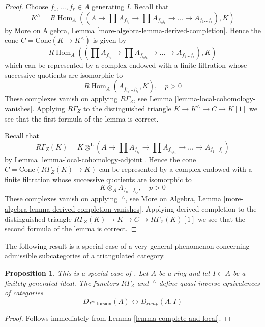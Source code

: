 \documentclass{stacks-project}
\newenvironment{reference}{\comment}{\endcomment}
\theoremstyle{plain}
\newtheorem{proposition}[subsection]{Proposition}
\theoremstyle{definition}
\theoremstyle{remark}
\numberwithin{equation}{subsection}
\def\Hom{\mathop{\mathrm{Hom}}\nolimits}
\begin{document}
\begin{proof}
Choose $f_1, \ldots, f_r \in A$ generating $I$. Recall that
$$
K^\wedge = R\Hom_A\left((A \to \prod A_{f_{i_0}}
\to \prod A_{f_{i_0i_1}} \to \ldots \to A_{f_1 \ldots f_r}), K\right)
$$
by More on Algebra, Lemma \ref{more-algebra-lemma-derived-completion}.
Hence the cone $C = \text{Cone}(K \to K^\wedge)$
is given by
$$
R\Hom_A\left((\prod A_{f_{i_0}}
\to \prod A_{f_{i_0i_1}} \to \ldots \to A_{f_1 \ldots f_r}), K\right)
$$
which can be represented by a complex endowed with a finite filtration
whose successive quotients are isomorphic to
$$
R\Hom_A(A_{f_{i_0} \ldots f_{i_p}}, K), \quad p > 0
$$
These complexes vanish on applying $R\Gamma_Z$, see
Lemma \ref{lemma-local-cohomology-vanishes}. Applying $R\Gamma_Z$
to the distinguished triangle $K \to K^\wedge \to C \to K[1]$
we see that the first formula of the lemma is correct.

\medskip\noindent
Recall that
$$
R\Gamma_Z(K) =
K \otimes^\mathbf{L} (A \to \prod A_{f_{i_0}}
\to \prod A_{f_{i_0i_1}} \to \ldots \to A_{f_1 \ldots f_r})
$$
by Lemma \ref{lemma-local-cohomology-adjoint}.
Hence the cone $C = \text{Cone}(R\Gamma_Z(K) \to K)$
can be represented by a complex endowed with a finite filtration
whose successive quotients are isomorphic to
$$
K \otimes_A A_{f_{i_0} \ldots f_{i_p}}, \quad p > 0
$$
These complexes vanish on applying ${\ }^\wedge$, see
More on Algebra, Lemma \ref{more-algebra-lemma-derived-completion-vanishes}.
Applying derived completion to the distinguished triangle
$R\Gamma_Z(K) \to K \to C \to R\Gamma_Z(K)[1]$
we see that the second formula of the lemma is correct.
\end{proof}

\noindent
The following result is a special case of a very general phenomenon
concerning admissible subcategories of a triangulated category.

\begin{proposition}
\label{proposition-torsion-complete}
\begin{reference}
This is a special case of \cite[Theorem 1.1]{Porta-Liran-Yekutieli}.
\end{reference}
Let $A$ be a ring and let $I \subset A$ be a finitely generated ideal.
The functors $R\Gamma_Z$ and ${\ }^\wedge$
define quasi-inverse equivalences of categories
$$
D_{I^\infty\text{-torsion}}(A) \leftrightarrow D_{comp}(A, I)
$$
\end{proposition}

\begin{proof}
Follows immediately from Lemma \ref{lemma-complete-and-local}.
\end{proof}
\end{document}
